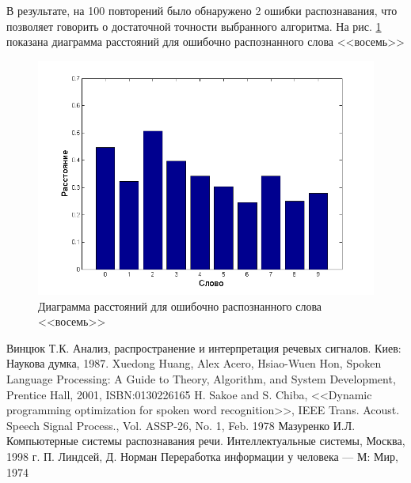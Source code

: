 \documentclass[14pt,russian,utf8]{extarticle}
\begin{document}
В результате, на 100 повторений было обнаружено 2 ошибки распознавания, что позволяет говорить о достаточной точности выбранного алгоритма. На рис. \ref{dist_err_8} показана диаграмма расстояний для ошибочно распознанного слова <<восемь>>

\begin{figure}[H]	
	\centering
	\includegraphics[width=120mm]{err_8.png}			
	\caption{Диаграмма расстояний для ошибочно распознанного слова <<восемь>>}
	\label{dist_err_8}
\end{figure}

\pagebreak
\begin{thebibliography}{9}
	Винцюк Т.К. Анализ, распространение и интерпретация речевых сигналов. Киев: Наукова думка, 1987.
	Xuedong Huang, Alex Acero, Hsiao-Wuen Hon, Spoken Language Processing: A Guide to Theory, Algorithm, and System Development, Prentice Hall, 2001, ISBN:0130226165
	H. Sakoe and S. Chiba, <<Dynamic programming optimization for spoken word recognition>>, IEEE   Trans.  Acoust. Speech  Signal  Process.,  Vol. ASSP-26, No. 1, Feb. 1978
	 Мазуренко И.Л. Компьютерные системы распознавания речи. Интеллектуальные системы, Москва, 1998 г.
	 П. Линдсей, Д. Норман Переработка информации у человека — М: Мир, 1974
\end{thebibliography}
\end{document}
